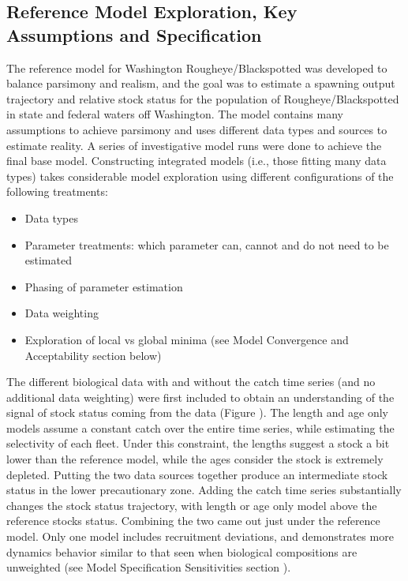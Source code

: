 \documentclass[
]{scrartcl}
\providecommand{\tightlist}{%
  \setlength{\itemsep}{0pt}\setlength{\parskip}{0pt}}\usepackage{longtable,booktabs,array}
\begin{document}
\subsection{Reference Model Exploration, Key Assumptions and
Specification}\label{reference-model-exploration-key-assumptions-and-specification}

The reference model for Washington Rougheye/Blackspotted was developed
to balance parsimony and realism, and the goal was to estimate a
spawning output trajectory and relative stock status for the population
of Rougheye/Blackspotted in state and federal waters off Washington. The
model contains many assumptions to achieve parsimony and uses different
data types and sources to estimate reality. A series of investigative
model runs were done to achieve the final base model. Constructing
integrated models (i.e., those fitting many data types) takes
considerable model exploration using different configurations of the
following treatments:

\begin{itemize}
\tightlist
\item
  Data types
\item
  Parameter treatments: which parameter can, cannot and do not need to
  be estimated
\item
  Phasing of parameter estimation
\item
  Data weighting
\item
  Exploration of local vs global minima (see Model Convergence and
  Acceptability section below)
\end{itemize}

The different biological data with and without the catch time series
(and no additional data weighting) were first included to obtain an
understanding of the signal of stock status coming from the data (Figure
). The length and age only models assume a constant catch over the
entire time series, while estimating the selectivity of each fleet.
Under this constraint, the lengths suggest a stock a bit lower than the
reference model, while the ages consider the stock is extremely
depleted. Putting the two data sources together produce an intermediate
stock status in the lower precautionary zone. Adding the catch time
series substantially changes the stock status trajectory, with length or
age only model above the reference stocks status. Combining the two came
out just under the reference model. Only one model includes recruitment
deviations, and demonstrates more dynamics behavior similar to that seen
when biological compositions are unweighted (see Model Specification
Sensitivities section ).
\end{document}

